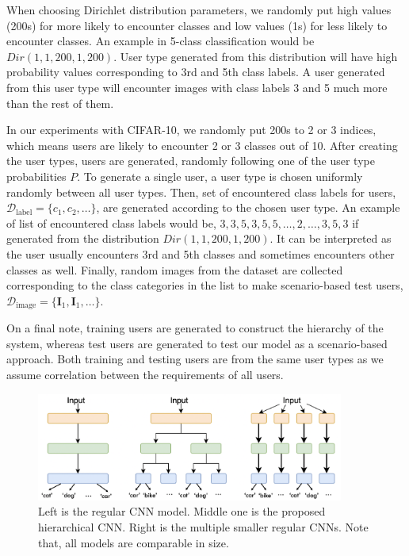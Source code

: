 When choosing Dirichlet distribution parameters, we randomly put high values (200s) for more likely to encounter classes and low values (1s) for less likely to encounter classes. An example in 5-class classification would be $Dir(1,1,200,1,200)$. 
User type generated from this distribution will have high probability values corresponding to 3rd and 5th class labels.
A user generated from this user type will encounter images with class labels 3 and 5 much more than the rest of them. 

In our experiments with CIFAR-10, we randomly put 200s to 2 or 3 indices, which means users are likely to encounter 2 or 3 classes out of 10.
After creating the user types, users are generated, randomly following one of the user type probabilities $P$.
To generate a single user, a user type is chosen uniformly randomly between all user types. 
Then, set of encountered class labels for users, $\mathcal{D}_\mathrm{label} = \{c_1,c_2,\dots\}$, are generated according to the chosen user type. 
An example of list of encountered class labels would be, ${3,3,5,3,5,5,\dots,2,\dots,3,5,3}$ if generated from the distribution $Dir(1,1,200,1,200)$. 
It can be interpreted as the user usually encounters 3rd and 5th classes and sometimes encounters other classes as well.
Finally, random images from the dataset are collected corresponding to the class categories in the list to make scenario-based test users, $\mathcal{D}_\mathrm{image} = \{\mathbf{I}_1,\mathbf{I}_1,\dots\}$.

On a final note, training users are generated to construct the hierarchy of the system, whereas test users are generated to test our model as a scenario-based approach. 
Both training and testing users are from the same user types as we assume correlation between the requirements of all users. 

\begin{figure}
    \centering
    \includegraphics[width=0.9\textwidth]{thesis/images/classification_baselines-fig.png}
    \caption{Left is the regular CNN model. Middle one is the proposed hierarchical CNN. Right is the multiple smaller regular CNNs. Note that, all models are comparable in size.}
    \label{fig:baselines}
\end{figure}

